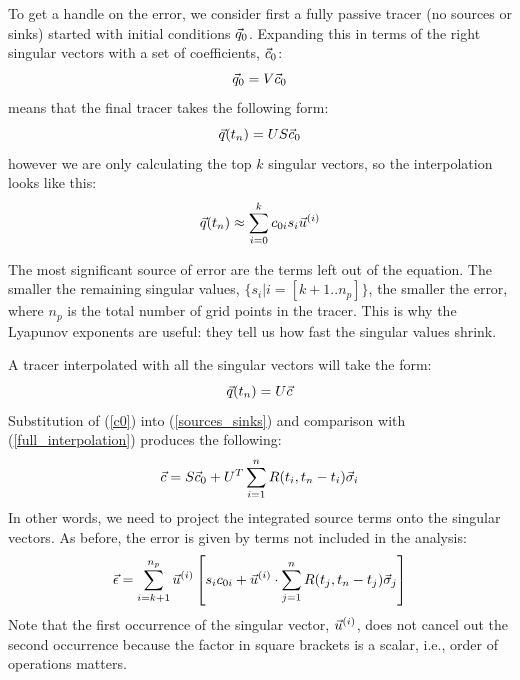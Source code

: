 To get a handle on the error, we consider first a fully passive tracer 
(no sources or sinks) started with initial conditions $\vec q_0$.
Expanding this in terms of the right singular vectors with a set
of coefficients, $\vec c_0$:
\begin{equation}
	\vec q_0 = V \vec c_0
	\label{c0}
\end{equation}
means that the final tracer takes the following form:
\begin{equation}
	\vec q(t_n) = U S \vec c_0
\end{equation}
however we are only calculating the top $k$ singular vectors, so the
interpolation looks like this:
\begin{equation}
	\vec q(t_n) \approx \sum_{i=0}^k c_{0i} s_i \vec u^{(i)}
\end{equation}

The most significant source of error are the terms left out of the equation.
The smaller the remaining singular values, $\lbrace s_i|i=[k+1..n_p]\rbrace$,
the smaller the error, where $n_p$ is the total number of grid points in the tracer.
This is why the Lyapunov exponents are useful:
they tell us how fast the singular values shrink.

A tracer interpolated with all the singular vectors will take the form:
\begin{equation}
	\vec q(t_n) = U \vec c
	\label{full_interpolation}
\end{equation}
Substitution of (\ref{c0}) into (\ref{sources_sinks}) and comparison with
(\ref{full_interpolation}) produces
the following:
\begin{equation}
	\vec c = S \vec c_0 + U^T \sum_{i=1}^n R(t_i, t_n-t_i) \vec \sigma_i
\end{equation}
In other words, we need to project the integrated source terms onto the
singular vectors.
As before, the error is given by terms not included in the analysis:
\begin{equation}
	\vec \epsilon = \sum_{i=k+1}^{n_p} \vec u^{(i)} \left [s_i c_{0i}
	+ \vec u^{(i)} \cdot \sum_{j=1}^n R(t_j, t_n-t_j) \vec \sigma_j \right ]
	\label{error1}
\end{equation}
Note that the first occurrence of the singular vector, $\vec u^{(i)}$, does not
cancel out the second occurrence because the factor in square brackets is a scalar, i.e., order of operations matters.


